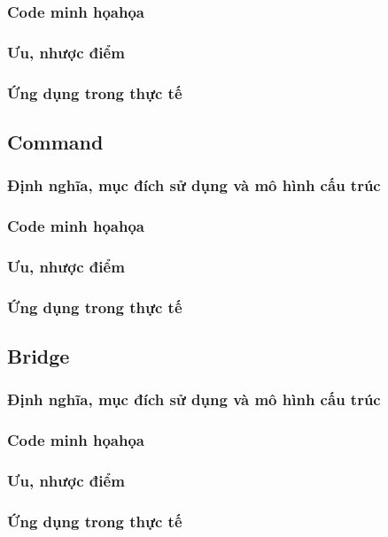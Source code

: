 \documentclass[14pt]{article}
\begin{document}
\subsubsection{ Code minh họahọa}
\subsubsection{ Ưu, nhược điểm}
\subsubsection{ Ứng dụng trong thực tế}

\subsection{Command}
\subsubsection{ Định nghĩa, mục đích sử dụng và mô hình cấu trúc}
\subsubsection{ Code minh họahọa}
\subsubsection{ Ưu, nhược điểm}
\subsubsection{ Ứng dụng trong thực tế}

\subsection{Bridge}
\subsubsection{ Định nghĩa, mục đích sử dụng và mô hình cấu trúc}
\subsubsection{ Code minh họahọa}
\subsubsection{ Ưu, nhược điểm}
\subsubsection{ Ứng dụng trong thực tế}
\end{document}
